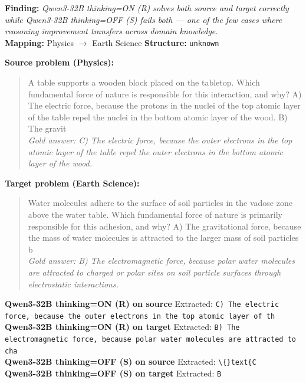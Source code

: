 \begin{tcolorbox}[
  colback=gray!5, colframe=gray!40,
  title={\textbf{Example 7: Structure-Invariant Gain (Rare: 4.8\% of gains)}},
  fonttitle=\small\bfseries, breakable]

\textbf{Finding:} \textit{Qwen3-32B thinking=ON (R) solves both source and target correctly while Qwen3-32B thinking=OFF (S) fails both — one of the few cases where reasoning improvement transfers across domain knowledge.}
\\[4pt]
\textbf{Mapping:} Physics $\to$ Earth Science \quad
\textbf{Structure:} \texttt{unknown}

\vspace{6pt}
\textbf{Source problem (Physics):}\\
\begin{quote}\small A table supports a wooden block placed on the tabletop. Which fundamental force of nature is responsible for this interaction, and why?
A) The electric force, because the protons in the nuclei of the top atomic layer of the table repel the nuclei in the bottom atomic layer of the wood.
B) The gravit\\
\textit{Gold answer: C) The electric force, because the outer electrons in the top atomic layer of the table repel the outer electrons in the bottom atomic layer of the wood.}\end{quote}

\textbf{Target problem (Earth Science):}\\
\begin{quote}\small Water molecules adhere to the surface of soil particles in the vadose zone above the water table. Which fundamental force of nature is primarily responsible for this adhesion, and why?
A) The gravitational force, because the mass of water molecules is attracted to the larger mass of soil particles b\\
\textit{Gold answer: B) The electromagnetic force, because polar water molecules are attracted to charged or polar sites on soil particle surfaces through electrostatic interactions.}\end{quote}

\vspace{4pt}
\textbf{Qwen3-32B thinking=ON (R) on source} \textcolor{darkgreen}{\cmark} Extracted: \texttt{C) The electric force, because the outer electrons in the top atomic layer of th}
\\[-2pt]
\textbf{Qwen3-32B thinking=ON (R) on target} \textcolor{darkgreen}{\cmark} Extracted: \texttt{B) The electromagnetic force, because polar water molecules are attracted to cha}
\\[-2pt]
\textbf{Qwen3-32B thinking=OFF (S) on source} \textcolor{red}{\xmark} Extracted: \texttt{\textbackslash\{\}text\{C}
\\[-2pt]
\textbf{Qwen3-32B thinking=OFF (S) on target} \textcolor{red}{\xmark} Extracted: \texttt{B}
\\[-2pt]
\end{tcolorbox}

